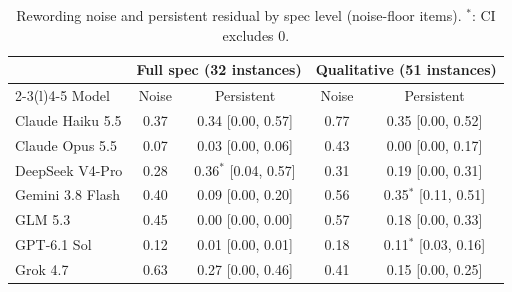 \documentclass[11pt]{article}
\newcommand{\sig}[1]{#1$^{\ast}$}
\begin{document}
\begin{table}[h]
\centering\footnotesize
\setlength{\tabcolsep}{4.5pt}
\begin{tabular}{@{}lcccc@{}}
\toprule
 & \multicolumn{2}{c}{Full spec (32 instances)} & \multicolumn{2}{c}{Qualitative (51 instances)} \\
\cmidrule(lr){2-3}\cmidrule(l){4-5}
Model & Noise & Persistent & Noise & Persistent \\
\midrule
Claude Haiku 5.5 & 0.37 & 0.34 [0.00, 0.57] & 0.77 & 0.35 [0.00, 0.52] \\
Claude Opus 5.5 & 0.07 & 0.03 [0.00, 0.06] & 0.43 & 0.00 [0.00, 0.17] \\
DeepSeek V4-Pro & 0.28 & \sig{0.36} [0.04, 0.57] & 0.31 & 0.19 [0.00, 0.31] \\
Gemini 3.8 Flash & 0.40 & 0.09 [0.00, 0.20] & 0.56 & \sig{0.35} [0.11, 0.51] \\
GLM 5.3 & 0.45 & 0.00 [0.00, 0.00] & 0.57 & 0.18 [0.00, 0.33] \\
GPT-6.1 Sol & 0.12 & 0.01 [0.00, 0.01] & 0.18 & \sig{0.11} [0.03, 0.16] \\
Grok 4.7 & 0.63 & 0.27 [0.00, 0.46] & 0.41 & 0.15 [0.00, 0.25] \\
\bottomrule
\end{tabular}
\caption{Rewording noise and persistent residual by spec level (noise-floor items). $^{\ast}$: CI excludes 0.}
\label{tab:spec}
\end{table}
\end{document}
